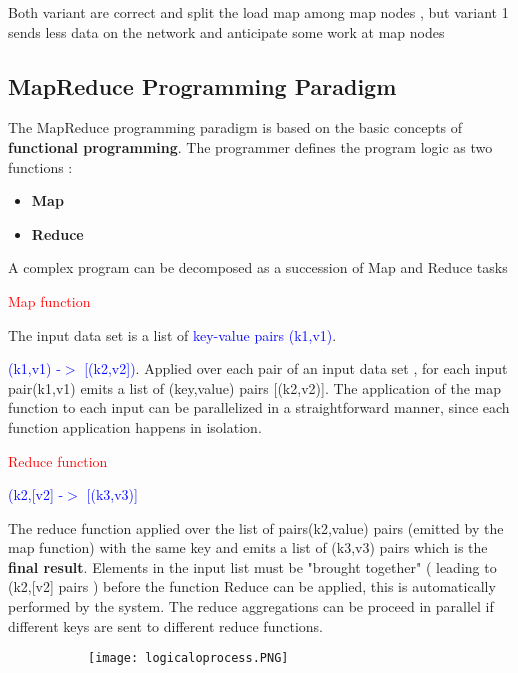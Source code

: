 \documentclass{article}
\begin{document}
Both variant are correct and split the load map among map nodes , but variant 1 sends less data on the network and anticipate some work at map nodes

\subsection{MapReduce Programming Paradigm}

The MapReduce programming paradigm is based on the basic concepts of \textbf{functional programming}. The programmer defines the program logic as two functions : 
\begin{itemize}
    \item \textbf{Map} 
    \item \textbf{Reduce} 
\end{itemize}
A complex program can be decomposed as a succession of Map and Reduce tasks

\textcolor{red}{Map function}

\vspace{3mm}
The input data set is a list of \textcolor{blue}{key-value pairs (k1,v1)}.

\textcolor{blue}{(k1,v1) -$>$ [(k2,v2])}.
Applied over each pair of an input data set , for each input pair(k1,v1) emits a list of (key,value) pairs [(k2,v2)].
The application of the map function to each input can be parallelized in a straightforward manner, since each function application happens in isolation.

\textcolor{red}{Reduce function}

\textcolor{blue}{(k2,[v2] -$>$ [(k3,v3)]}

The reduce function applied over the list of pairs(k2,value) pairs (emitted by the map function) with the same key and emits a list of (k3,v3) pairs which is the \textbf{final result}.
Elements in the input list must be "brought together" ( leading to (k2,[v2] pairs ) before the function Reduce can be applied, this is automatically performed by the system. The reduce aggregations can be proceed in parallel if different keys are sent to different reduce functions.
\vspace{5mm}
\begin{figure}[ht!]
  \centering
  \begin{subfigure}[b]{0.5\linewidth}
    \texttt{[image: logicaloprocess.PNG]}
  \end{subfigure}
\end{figure}
\end{document}
